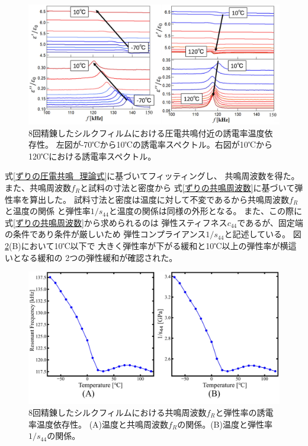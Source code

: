 \documentclass[dvipdfmx,12pt,a4paper]{jreport}
\begin{document}
			\newpage
			\begin{figure}[h]
				\centering
				\includegraphics[width=\linewidth]{8回_誘電率温度依存性_共鳴付近.jpg}
				\caption{8回精錬したシルクフィルムにおける圧電共鳴付近の誘電率温度依存性。
				左図が-70℃から10℃の誘電率スペクトル。右図が10℃から120℃における誘電率スペクトル。}
				\label{8回誘電率温度依存性_拡大図}
			\end{figure}
			式\ref{ずりの圧電共鳴_理論式}に基づいてフィッティングし、
			共鳴周波数を得た。また、共鳴周波数$f_R$と試料の寸法と密度から
			式\ref{ずりの共鳴周波数}に基づいて弾性率を算出した。
			試料寸法と密度は温度に対して不変であるから共鳴周波数$f_R$と温度の関係
			と弾性率$1/s_{44}$と温度の関係は同様の外形となる。
			また、この際に式\ref{ずりの共鳴周波数}から求められるのは
			弾性スティフネス$c_{44}$であるが、固定端の条件であり条件が厳しいため
			弾性コンプライアンス$1/s_{44}$と記述している。
			図\ref{8回_共鳴周波数_弾性率_温度依存性}(B)において10℃以下で
			大きく弾性率が下がる緩和と10℃以上の弾性率が横這いとなる緩和の
			2つの弾性緩和が確認された。
			\begin{figure}[H]
				\centering
				\includegraphics[width=\linewidth]{8回_共鳴周波数_弾性率_温度依存性.jpg}
				\caption{8回精錬したシルクフィルムにおける共鳴周波数$f_R$と弾性率の誘電率温度依存性。
				(A)温度と共鳴周波数$f_R$の関係。(B)温度と弾性率$1/s_{44}$の関係。}
				\label{8回_共鳴周波数_弾性率_温度依存性}
			\end{figure}
\end{document}
